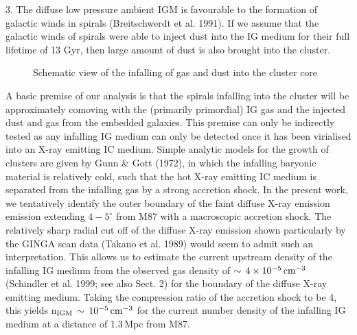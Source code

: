 \documentclass[]{aa}
\begin{document}
3. The diffuse low pressure ambient IGM is favourable to the formation of 
galactic winds in spirals \newline (Breitschwerdt et al. 1991). If we
assume that the galactic winds of spirals were able to inject dust into the IG
medium for their full lifetime of 13 Gyr, then large amount of dust is
also brought into the cluster. 

\begin{figure}[htb]
\caption[]{Schematic view of the infalling of gas and dust into the cluster
core }
\end{figure} 

A basic premise of our analysis is that
the spirals infalling into the cluster will be approximately comoving with 
the (primarily primordial) IG gas and the injected dust and gas
from the embedded
galaxies. This premise can only be indirectly tested as any infalling
IG medium can only be detected once it has been virialised into an 
X-ray emitting IC medium. 
Simple analytic models for the growth of clusters are given by
Gunn \& Gott (1972), in which the infalling baryonic material is
relatively cold, such that the hot X-ray emitting IC medium is separated from
the infalling gas by a strong accretion shock. 
In the present work, we tentatively identify the outer boundary of the
faint diffuse X-ray emission emission extending $4-5^{\circ}$ from M87 with
a macroscopic accretion shock.
The relatively
sharp radial cut off of the diffuse X-ray emission shown particularly by the
GINGA scan data (Takano et al. 1989) would seem to admit such an
interpretation. 
This allows us to estimate the current
upstream density of the infalling IG medium from the observed gas density
of $\sim\,4\times 10^{-5}\,{\rm cm}^{-3}$ (Schindler et al. 1999; see also 
Sect. 2) for the boundary of the diffuse X-ray emitting medium. Taking
the compression ratio of the accretion shock to be 4, this yields 
n$_{\rm IGM}\,\sim\,10^{-5}\,{\rm cm}^{-3}$ for the current number density of 
the infalling IG medium at a distance of 1.3$\,$Mpc from M87. 
\end{document}
